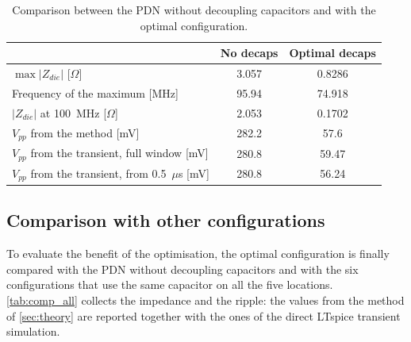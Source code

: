 \begin{table}[!h]
\centering
\caption{Comparison between the PDN without decoupling capacitors and with the optimal configuration.}
\label{tab:comp_best}
\begin{tabular}{lcc}
\hline
 & \textbf{No decaps} & \textbf{Optimal decaps} \\
\hline
$\max |Z_{die}|$ [$\Omega$]                          & 3.057 & 0.8286 \\
Frequency of the maximum [MHz]                       & 95.94 & 74.918 \\
$|Z_{die}|$ at 100~MHz [$\Omega$]                    & 2.053 & 0.1702 \\
$V_{pp}$ from the method [mV]                        & 282.2 & 57.6 \\
$V_{pp}$ from the transient, full window [mV] & 280.8 & 59.47 \\
$V_{pp}$ from the transient, from 0.5~$\mu$s [mV] & 280.8 & 56.24 \\
\hline
\end{tabular}
\end{table}


\subsection{Comparison with other configurations}

To evaluate the benefit of the optimisation, the optimal configuration is finally compared with the PDN without decoupling capacitors and with the six configurations that
use the same capacitor on all the five locations. \autoref{tab:comp_all} collects the impedance and the ripple: the values from the method of \autoref{sec:theory} are
reported together with the ones of the direct LTspice transient simulation.

